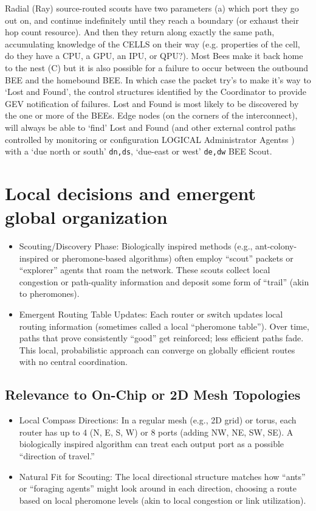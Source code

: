 Radial (Ray) source-routed scouts have two parameters (a) which port they go out on, and continue indefinitely until they reach a boundary (or exhaust their hop count resource). And then they return along exactly the same path, accumulating knowledge of the CELLS on their way (e.g. properties of the cell, do they have a CPU, a GPU, an IPU, or QPU?).  Most Bees make it back home to the nest (C) but it is also possible for a failure to occur between the outbound BEE and the homebound BEE. In which case the packet try's to make it's way to `Lost and Found', the control structures identified by the Coordinator to provide GEV notification of failures.  Lost and Found is most likely to be discovered by the one or more of the BEEs. Edge nodes (on the corners of the interconnect), will always be able to `find' Lost and Found (and other external control paths controlled by monitoring or configuration LOGICAL Administrator Agentss ) with a `due north or south'  \texttt{dn,ds}, `due-east or west' \texttt{de,dw} BEE Scout. 




\section{Local decisions and emergent global organization}

\begin{itemize}
\item Scouting/Discovery Phase: Biologically inspired methods (e.g., ant-colony-inspired or pheromone-based algorithms) often employ “scout” packets or “explorer” agents that roam the network. These scouts collect local congestion or path-quality information and deposit some form of “trail” (akin to pheromones).
\item Emergent Routing Table Updates: Each router or switch updates local routing information (sometimes called a local “pheromone table”). Over time, paths that prove consistently ``good'' get reinforced; less efficient paths fade. This local, probabilistic approach can converge on globally efficient routes with no central coordination.
\end{itemize}

\subsection{Relevance to On-Chip or 2D Mesh Topologies}

\begin{itemize}
\item Local Compass Directions: In a regular mesh (e.g., 2D grid) or torus, each router has up to 4 (N, E, S, W) or 8 ports (adding NW, NE, SW, SE). A biologically inspired algorithm can treat each output port as a possible ``direction of travel.''
\item Natural Fit for Scouting: The local directional structure matches how “ants” or “foraging agents” might look around in each direction, choosing a route based on local pheromone levels (akin to local congestion or link utilization).
\end{itemize}

